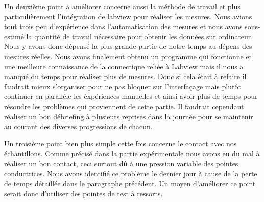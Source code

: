 \bigskip

Un deuxième point à améliorer concerne aussi la méthode de travail et plus particulièrement l'intégration de labview pour réaliser les mesures. Nous avions tout trois peu d'expérience dans l'automatisation des mesures et nous avons sous-estimé la quantité de travail nécessaire pour obtenir les données sur ordinateur. Nous y avons donc dépensé la plus grande partie de notre temps au dépens des mesures réelles. Nous avons finalement obtenu un programme qui fonctionne et une meilleure connaissance de la connectique reliée à Labview mais il nous a manqué du temps pour réaliser plus de mesures. Donc si cela était à refaire il faudrait mieux s'organiser pour ne pas bloquer sur l'interfaçage mais plutôt continuer en parallèle les éxpériences manuelles et ainsi avoir plus de temps pour résoudre les problèmes qui proviennent de cette partie. Il faudrait cependant réaliser un bon débriefing à plusieurs reprises dans la journée pour se maintenir au courant des diverses progressions de chacun. 

\bigskip

Un troisième point bien plus simple cette fois concerne le contact avec nos échantillons. Comme précisé dans la partie expérimentale nous avons eu du mal à réaliser un bon contact, ceci surtout dû à une pression variable des pointes conductrices. Nous avons identifié ce problème le dernier jour à cause de la perte de temps détaillée dans le paragraphe précédent.  Un moyen d'améliorer ce point serait donc d'utiliser des pointes de test à ressorts.
